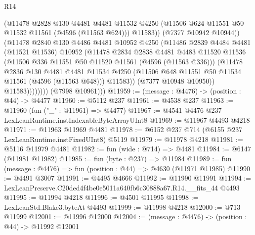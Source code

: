 \begin{lexlean}{R14}
\begin{coremodule}
                          (@11478
                            @2828
                            @130
                            @4481
                            @4481
                            @11532
                            @4250
                            (@11506 @624 @11551 @50 @11532 @11561 (@4596 (@11563 @624)))
                            @11583))
                        (@7377 @10942 @10944))
                      (@11478
                        @2840
                        @130
                        @4486
                        @4481
                        @10952
                        @4250
                        (@11486
                          @2839
                          @4484
                          @4481
                          (@11521 @11536)
                          @10952
                          (@11478
                            @2834
                            @2838
                            @4481
                            @4483
                            @11520
                            @11536
                            (@11506 @336 @11551 @50 @11520 @11561 (@4596 (@11563 @336)))
                            (@11478
                              @2836
                              @130
                              @4481
                              @4481
                              @11534
                              @4250
                              (@11506 @648 @11551 @50 @11534 @11561 (@4596 (@11563 @648)))
                              @11583))
                          (@7377 @10948 @10950))
                        @11583))))))))
        (@7998 @10961)))
@11959 := (message : @4476) -> (position : @44) -> @4477
@11960 := @5112 @237
@11961 := @4538 @237
@11963 := @11960 (fun ("_" : @11961) => @4477)
@11967 := @4541 @4476 @237 LexLeanRuntime.instIndexableByteArrayUInt8
@11969 := @11967 @4493 @4218
@11971 := @11963 @11969 @4481
@11978 := @6152 @237 @714 (@6155 @237 LexLeanRuntime.instFixedUInt8) @5119
@11979 := @11978 @4218
@11981 := @5116 @11979 @4481
@11982 := fun (wide : @714) => @4481
@11984 := @6147 (@11981 @11982)
@11985 := fun (byte : @237) => @11984
@11989 := fun (message : @4476) => fun (position : @44) => @4630 (@11971 @11985)
@11990 := @4491 @3007
@11991 := @4495 @4666
@11992 := @11990 @11991
@11994 := LexLeanPreserve.C20ded4f4be0e5011a640fb6c30888a67.R14.__fits_44 @4493
@11995 := @11994 @4218
@11996 := @4501 @11995
@11998 := LexLeanStd.Blake3.byteAt @4493
@11999 := @11998 @4218
@12000 := @713 @11999
@12001 := @11996 @12000
@12004 := (message : @4476) -> (position : @44) -> @11992 @12001

\end{coremodule}
\end{lexlean}
